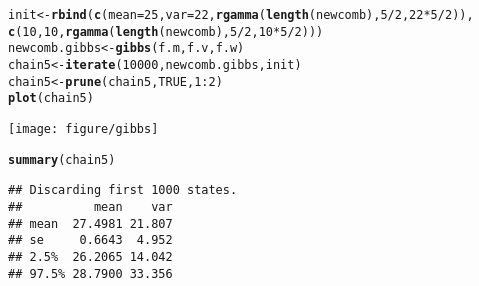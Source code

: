 \documentclass{article}\usepackage[]{graphicx}\usepackage[]{color}
\makeatletter
\def\maxwidth{ %
  \ifdim\Gin@nat@width>\linewidth
    \linewidth
  \else
    \Gin@nat@width
  \fi
}
\newcommand{\hlnum}[1]{\textcolor[rgb]{0.686,0.059,0.569}{#1}}%
\newcommand{\hlopt}[1]{\textcolor[rgb]{0,0,0}{#1}}%
\newcommand{\hlstd}[1]{\textcolor[rgb]{0.345,0.345,0.345}{#1}}%
\newcommand{\hlkwb}[1]{\textcolor[rgb]{0.69,0.353,0.396}{#1}}%
\newcommand{\hlkwc}[1]{\textcolor[rgb]{0.333,0.667,0.333}{#1}}%
\newcommand{\hlkwd}[1]{\textcolor[rgb]{0.737,0.353,0.396}{\textbf{#1}}}%
\newenvironment{kframe}{%
 \def\at@end@of@kframe{}%
 \ifinner\ifhmode%
  \def\at@end@of@kframe{\end{minipage}}%
  \begin{minipage}{\columnwidth}%
 \fi\fi%
 \def\FrameCommand##1{\hskip\@totalleftmargin \hskip-\fboxsep
 \colorbox{shadecolor}{##1}\hskip-\fboxsep
     \hskip-\linewidth \hskip-\@totalleftmargin \hskip\columnwidth}%
 \MakeFramed {\advance\hsize-\width
   \@totalleftmargin\z@ \linewidth\hsize
   \@setminipage}}%
 {\par\unskip\endMakeFramed%
 \at@end@of@kframe}
\newenvironment{knitrout}{}{} %
\makeatother
\begin{document}
\begin{knitrout}
\color{fgcolor}\begin{kframe}
\begin{alltt}
\hlstd{init} \hlkwb{<-} \hlkwd{rbind}\hlstd{(}\hlkwd{c}\hlstd{(}\hlkwc{mean} \hlstd{=} \hlnum{25}\hlstd{,} \hlkwc{var} \hlstd{=} \hlnum{22}\hlstd{,} \hlkwd{rgamma}\hlstd{(}\hlkwd{length}\hlstd{(newcomb),} \hlnum{5}\hlopt{/}\hlnum{2}\hlstd{,} \hlnum{22} \hlopt{*} \hlnum{5}\hlopt{/}\hlnum{2}\hlstd{)),}
    \hlkwd{c}\hlstd{(}\hlnum{10}\hlstd{,} \hlnum{10}\hlstd{,} \hlkwd{rgamma}\hlstd{(}\hlkwd{length}\hlstd{(newcomb),} \hlnum{5}\hlopt{/}\hlnum{2}\hlstd{,} \hlnum{10} \hlopt{*} \hlnum{5}\hlopt{/}\hlnum{2}\hlstd{)))}
\hlstd{newcomb.gibbs} \hlkwb{<-} \hlkwd{gibbs}\hlstd{(f.m, f.v, f.w)}
\hlstd{chain5} \hlkwb{<-} \hlkwd{iterate}\hlstd{(}\hlnum{10000}\hlstd{, newcomb.gibbs, init)}
\hlstd{chain5} \hlkwb{<-} \hlkwd{prune}\hlstd{(chain5,} \hlnum{TRUE}\hlstd{,} \hlnum{1}\hlopt{:}\hlnum{2}\hlstd{)}
\hlkwd{plot}\hlstd{(chain5)}
\end{alltt}
\end{kframe}
\texttt{[image: figure/gibbs]} 
\begin{kframe}\begin{alltt}
\hlkwd{summary}\hlstd{(chain5)}
\end{alltt}
\begin{verbatim}
## Discarding first 1000 states.
##          mean    var
## mean  27.4981 21.807
## se     0.6643  4.952
## 2.5%  26.2065 14.042
## 97.5% 28.7900 33.356
\end{verbatim}
\end{kframe}
\end{knitrout}
\end{document}
